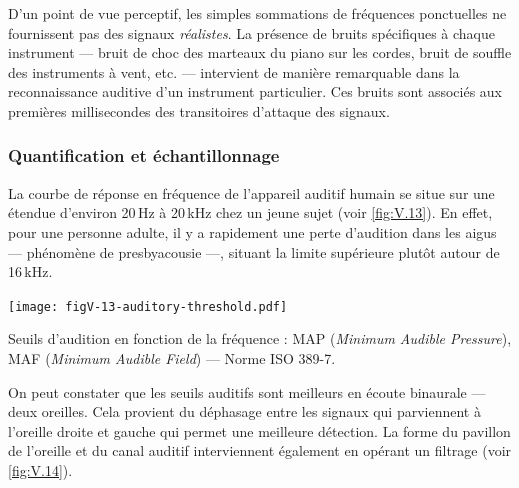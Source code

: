 D'un point de vue perceptif, les simples sommations de fréquences ponctuelles ne fournissent pas des signaux \emph{réalistes}. La présence de bruits spécifiques à chaque instrument --- bruit de choc des marteaux du piano sur les cordes, bruit de souffle des instruments à vent, etc. --- intervient de manière remarquable dans la reconnaissance auditive d'un instrument particulier. Ces bruits sont associés aux premières millisecondes des transitoires d'attaque des signaux.

\subsubsection[Quantification et échantillonnage]{Quantification et échantillonnage}
\label{subsub:V.2.2.2}



La courbe de réponse en fréquence de l'appareil auditif humain se situe sur une étendue d'environ 20\,Hz à 20\,kHz chez un jeune sujet (voir \cref{fig:V.13}). En effet, pour une personne adulte, il y a rapidement une perte d'audition dans les aigus --- phénomène de presbyacousie ---, situant la limite supérieure plutôt autour de 16\,kHz.

\begin{marginfigure}%
\texttt{[image: figV-13-auditory-threshold.pdf]}%
\caption{\label{fig:V.13}Seuils d'audition en fonction de la fréquence : MAP (\emph{Minimum Audible Pressure}), MAF (\emph{Minimum Audible Field}) --- Norme ISO 389-7.}
\end{marginfigure}

On peut constater que les seuils auditifs sont meilleurs en écoute binaurale --- deux oreilles. Cela provient du déphasage entre les signaux qui parviennent à l'oreille droite et gauche qui permet une meilleure détection. La forme du pavillon de l'oreille et du canal auditif interviennent également en opérant un filtrage (voir \cref{fig:V.14}).

